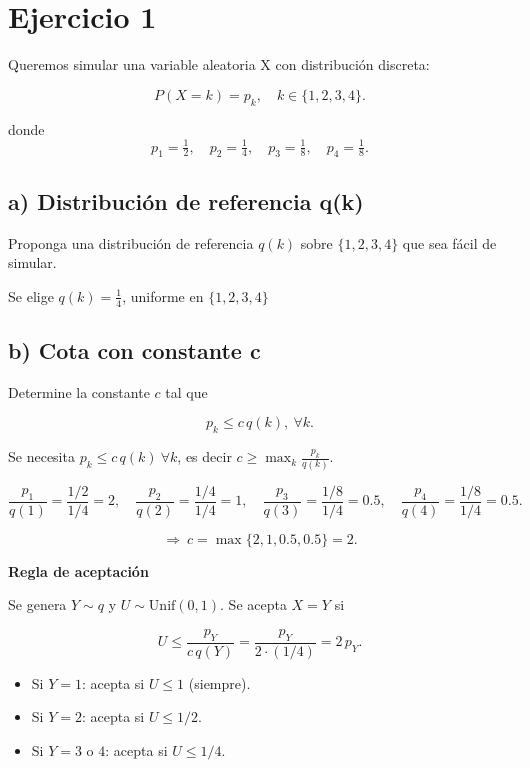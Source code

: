 \documentclass[10pt,a4paper]{article}
\let\le\leqslant
\let\ge\geqslant
\let\leq\leqslant
\let\geq\geqslant
\providecommand{\tightlist}{%
      \setlength{\itemsep}{0pt}\setlength{\parskip}{0pt}}
\let\le\leq
\let\ge\geq
\let\oldsection\section
\renewcommand{\section}{%
      \clearpage
      \thispagestyle{myfancy}%
      \oldsection
    }
\begin{document}
    \hypertarget{ejercicio-1}{%
\section{Ejercicio 1}\label{ejercicio-1}}

    Queremos simular una variable aleatoria X con distribución discreta:

\[
P(X = k) = p_k,\quad k\in\{1,2,3,4\}.
\]

donde \[
p_1=\tfrac{1}{2},\quad p_2=\tfrac{1}{4},\quad p_3=\tfrac{1}{8},\quad p_4=\tfrac{1}{8}.
\]

    \hypertarget{a-distribuciuxf3n-de-referencia-qk}{%
\subsection{a) Distribución de referencia
q(k)}\label{a-distribuciuxf3n-de-referencia-qk}}

    Proponga una distribución de referencia \(q(k)\) sobre
\(\{1, 2, 3, 4\}\) que sea fácil de simular.

    Se elige \(q(k)=\tfrac14\), uniforme en \(\{1,2,3,4\}\)

    \hypertarget{b-cota-con-constante-c}{%
\subsection{b) Cota con constante c}\label{b-cota-con-constante-c}}

    Determine la constante \(c\) tal que

\[
p_k \le c\, q(k),\ \forall k.
\]

    Se necesita \(p_k\le c\,q(k)\ \forall k\), es decir
\(c\ge \max_k \frac{p_k}{q(k)}\).

\[
\frac{p_1}{q(1)}=\frac{1/2}{1/4}=2,\quad
\frac{p_2}{q(2)}=\frac{1/4}{1/4}=1,\quad
\frac{p_3}{q(3)}=\frac{1/8}{1/4}=0.5,\quad
\frac{p_4}{q(4)}=\frac{1/8}{1/4}=0.5.
\]

\[
\Rightarrow\ \boxed{c=\max\{2,1,0.5,0.5\}=2.}
\]

\textbf{Regla de aceptación}

Se genera \(Y\sim q\) y \(U\sim \mathrm{Unif}(0,1)\). Se acepta \(X=Y\)
si

\[
U\le \frac{p_Y}{c\,q(Y)}=\frac{p_Y}{2\cdot(1/4)}=2\,p_Y.
\]

\begin{itemize}
\tightlist
\item
  Si \(Y=1\): acepta si \(U\le 1\) (siempre).
\item
  Si \(Y=2\): acepta si \(U\le 1/2\).
\item
  Si \(Y=3\) o \(4\): acepta si \(U\le 1/4\).
\end{itemize}
\end{document}
